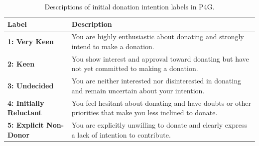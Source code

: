 \begin{table}[ht]
    \centering
    \small
    \begin{tabular}{p{3cm}p{12cm}}
        \toprule
        \textbf{Label} & \textbf{Description}\\
        \midrule
        \textbf{1: Very Keen} & You are highly enthusiastic about donating and strongly intend to make a donation. \\
        \textbf{2: Keen} & You show interest and approval toward donating but have not yet committed to making a donation. \\
        \textbf{3: Undecided} & You are neither interested nor disinterested in donating and remain uncertain about your intention. \\
        \textbf{4: Initially Reluctant} & You feel hesitant about donating and have doubts or other priorities that make you less inclined to donate. \\
        \textbf{5: Explicit Non-Donor} & You are explicitly unwilling to donate and clearly express a lack of intention to contribute. \\
        \bottomrule
    \end{tabular}
    \caption{Descriptions of initial donation intention labels in P4G.}
    \label{tab:initial-intention}
\end{table}
